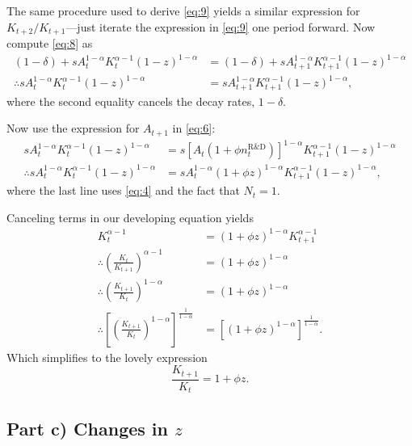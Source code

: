 \documentclass[12pt]{pracjourn_rwr}
\theoremstyle{definition}
\theoremstyle{remark}
\begin{document}
The same procedure used to derive \eqref{eq:9} yields a similar expression for $K_{t+2} / K_{t+1}$---just
iterate the expression in \eqref{eq:9} one period forward.
Now compute \eqref{eq:8} as
\begin{align*}
(1-\delta) + sA_{t}^{1-\alpha}K_{t}^{\alpha-1} \left( 1-z \right)^{1-\alpha} &=
(1-\delta) + sA_{t+1}^{1-\alpha}K_{t+1}^{\alpha-1} \left( 1-z \right)^{1-\alpha} \\
\therefore sA_{t}^{1-\alpha}K_{t}^{\alpha-1} \left( 1-z \right)^{1-\alpha} &=
sA_{t+1}^{1-\alpha}K_{t+1}^{\alpha-1} \left( 1-z \right)^{1-\alpha},
\end{align*}
where the second equality cancels the decay rates, $1-\delta$.

Now use the expression for $A_{t+1}$ in \eqref{eq:6}:
\begin{align*}
sA_{t}^{1-\alpha}K_{t}^{\alpha-1} \left( 1-z \right)^{1-\alpha} &=
s \left[ A_{t} \left( 1+\phi n_{t}^{\text{R\&D}} \right) \right]^{1-\alpha}K_{t+1}^{\alpha-1} \left( 1-z \right)^{1-\alpha} \\
\therefore sA_{t}^{1-\alpha}K_{t}^{\alpha-1} \left( 1-z \right)^{1-\alpha} &=
s A_{t}^{1-\alpha} \left( 1+\phi z \right)^{1-\alpha}K_{t+1}^{\alpha-1} \left( 1-z \right)^{1-\alpha},
\end{align*}
where the last line uses \eqref{eq:4} and the fact that $N_{t} = 1$.

Canceling terms in our developing equation yields
\begin{align*}
K_{t}^{\alpha-1} &=
\left( 1+\phi z \right)^{1-\alpha}K_{t+1}^{\alpha-1} \\
\therefore \left( \frac{K_{t}}{K_{t+1}} \right)^{\alpha-1} &= \left( 1+\phi z \right)^{1-\alpha} \\
\therefore \left( \frac{K_{t+1}}{K_{t}} \right)^{1-\alpha} &= \left( 1+\phi z \right)^{1-\alpha} \\
\therefore \left[ \left( \frac{K_{t+1}}{K_{t}} \right)^{1-\alpha} \right]^{\frac{1}{1-\alpha}} &=
\left[ \left( 1+\phi z \right)^{1-\alpha} \right]^{\frac{1}{1-\alpha}}.
\end{align*}
Which simplifies to the lovely expression
\begin{equation}
\label{eq:10}
\frac{K_{t+1}}{K_{t}} = 1 + \phi z.
\end{equation}

\subsection{Part c) Changes in $z$}
\end{document}
